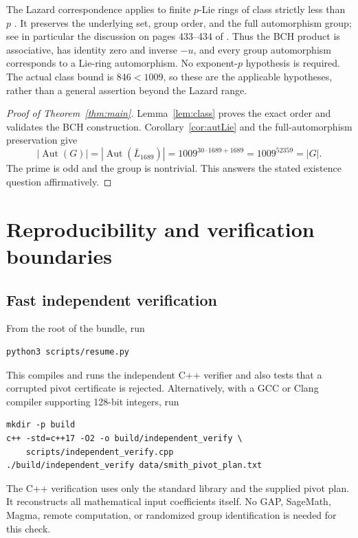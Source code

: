 \documentclass[11pt]{article}
\theoremstyle{definition}\newtheorem{definition}[theorem]{Definition}
\theoremstyle{remark}\newtheorem{remark}[theorem]{Remark}
\DeclareMathOperator{\Aut}{Aut}
\begin{document}
The Lazard correspondence applies to finite $p$-Lie rings of class strictly
less than $p$ \cite{Lazard,CDV}. It preserves the underlying set, group order,
and the full automorphism group; see in particular the discussion on
pages 433--434 of \cite{CDV}. Thus the BCH product is associative, has
identity zero and inverse $-u$, and every group automorphism corresponds
to a Lie-ring automorphism. No exponent-$p$ hypothesis is required.
The actual class bound is $846<1009$, so these are the applicable
hypotheses, rather than a general assertion beyond the Lazard range.

\begin{proof}[Proof of Theorem~\ref{thm:main}]
Lemma~\ref{lem:class} proves the exact order and validates the BCH construction.
Corollary~\ref{cor:autLie} and the full-automorphism preservation give
\[
 |\Aut(G)|=|\Aut(\bar L_{1689})|
 =1009^{30\cdot1689+1689}
 =1009^{52359}=|G|.
\]
The prime is odd and the group is nontrivial. This answers the stated
existence question affirmatively.
\end{proof}

\section{Reproducibility and verification boundaries}
\subsection{Fast independent verification}
From the root of the bundle, run
\begin{verbatim}
python3 scripts/resume.py
\end{verbatim}
This compiles and runs the independent C++ verifier and also tests that a
corrupted pivot certificate is rejected. Alternatively, with a GCC or
Clang compiler supporting 128-bit integers, run
\begin{verbatim}
mkdir -p build
c++ -std=c++17 -O2 -o build/independent_verify \
    scripts/independent_verify.cpp
./build/independent_verify data/smith_pivot_plan.txt
\end{verbatim}
The C++ verification uses only the standard library and the supplied
pivot plan. It reconstructs all mathematical input coefficients itself.
No GAP, SageMath, Magma, remote computation, or randomized group
identification is needed for this check.
\end{document}
